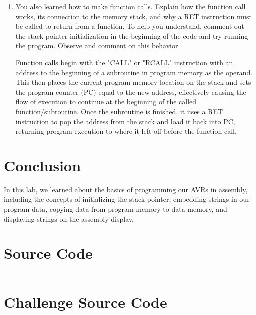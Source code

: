 \documentclass[12pt,letterpaper]{article}
\begin{document}
\begin{enumerate}
    \item You also learned how to make function calls. Explain how the function
        call works, its connection to the memory stack, and why a RET
        instruction must be called to return from a function. To help you
        understand, comment out the stack pointer initialization in the
        beginning of the code and try running the program. Observe and comment
        on this behavior.

        Function calls begin with the "CALL" or "RCALL" instruction with an
        address to the beginning of a subroutine in program memory as the
        operand.  This then places the current program memory location on the
        stack and sets the program counter (PC) equal to the new address,
        effectively causing the flow of execution to continue at the beginning
        of the called function/subroutine.  Once the subroutine is finished, it
        uses a RET instruction to pop the address from the stack and load it
        back into PC, returning program execution to where it left off before
        the function call.

\end{enumerate}

\section{Conclusion}

In this lab, we learned about the basics of programming our AVRs in assembly,
including the concepts of initializing the stack pointer, embedding strings in
our program data, copying data from program memory to data memory, and
displaying strings on the assembly display.

\section{Source Code}

\begin{verbatim}
\end{verbatim}

\pagebreak

\section{Challenge Source Code}

\begin{verbatim}
\end{verbatim}
\end{document}
